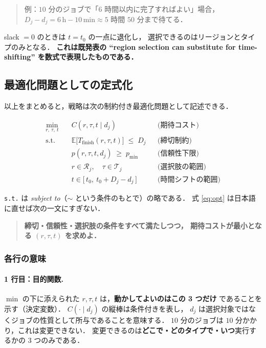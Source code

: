 \documentclass[11pt,a4paper]{ltjsarticle}
\newcommand{\Tfin}{T_{\mathrm{finish}}}
\newcommand{\E}{\mathbb{E}}
\begin{document}
\begin{quote}
例：$10$ 分のジョブで「$6$ 時間以内に完了すればよい」場合，
$D_j - d_j = 6\,\mathrm{h} - 10\,\mathrm{min} \approx 5$ 時間 $50$ 分まで待てる．
\end{quote}

slack $=0$ のときは $t = t_0$ の一点に退化し，
選択できるのはリージョンとタイプのみとなる．
\textbf{これは既発表の “region selection can substitute for time-shifting”
を数式で表現したものである．}

\subsection{最適化問題としての定式化}

以上をまとめると，戦略は次の制約付き最適化問題として記述できる．

\begin{equation}
\begin{aligned}
\min_{r,\ \tau,\ t}\quad
  & C(r,\tau,t \mid d_j)
  && \text{(期待コスト)} \\[4pt]
\text{s.t.}\quad
  & \E\bigl[\Tfin(r,\tau,t)\bigr] \;\le\; D_j
  && \text{(締切制約)} \\[2pt]
  & p(r,\tau,t,d_j) \;\ge\; p_{\min}
  && \text{(信頼性下限)} \\[2pt]
  & r \in \mathcal{R}_j,\quad \tau \in \mathcal{T}_j
  && \text{(選択肢の範囲)} \\[2pt]
  & t \in \bigl[\,t_0,\ t_0 + D_j - d_j\,\bigr]
  && \text{(時間シフトの範囲)}
\end{aligned}
\label{eq:opt}
\end{equation}

\texttt{s.t.} は \textit{subject to}（$\sim$ という条件のもとで）の略である．
式 \eqref{eq:opt} は日本語に直せば次の一文にすぎない．

\begin{quote}
\textbf{締切・信頼性・選択肢の条件をすべて満たしつつ，
期待コストが最小となる $(r,\tau,t)$ を求めよ．}
\end{quote}

\subsubsection{各行の意味}

\paragraph{1 行目：目的関数.}
$\min$ の下に添えられた $r,\tau,t$ は，\textbf{動かしてよいのはこの 3 つだけ}
であることを示す（決定変数）．
$C(\cdot \mid d_j)$ の縦棒は条件付きを表し，
$d_j$ は選択対象ではなくジョブの性質として所与であることを意味する．
$10$ 分のジョブは $10$ 分かかり，これは変更できない．
変更できるのは\textbf{どこで・どのタイプで・いつ}実行するかの 3 つのみである．
\end{document}
